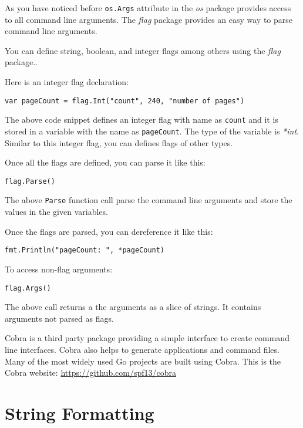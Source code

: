 As you have noticed before \texttt{os.Args} attribute in the \textit{os} package
provides access to all command line arguments.
The \textit{flag} package provides an easy way to parse
command line arguments.

You can define string, boolean, and integer flags among others using
the \textit{flag} package..

Here is an integer flag declaration:

\begin{lstlisting}[numbers=none]
var pageCount = flag.Int("count", 240, "number of pages")
\end{lstlisting}

The above code snippet defines an integer flag with name
as \texttt{count} and it is stored in a variable with the name
as \texttt{pageCount}.  The type of the variable is \textit{*int}.
Similar to this integer flag, you can defines flags of other types.

Once all the flags are defined, you can parse it like this:

\begin{lstlisting}[numbers=none]
flag.Parse()
\end{lstlisting}

The above \texttt{Parse} function call parse the command line
arguments and store the values in the given variables.

Once the flags are parsed, you can dereference it like this:

\begin{lstlisting}[numbers=none]
fmt.Println("pageCount: ", *pageCount)
\end{lstlisting}

To access non-flag arguments:

\begin{lstlisting}[numbers=none]
flag.Args()
\end{lstlisting}

The above call returns a the arguments as a slice of strings.  It
contains arguments not parsed as flags.

Cobra is a third party package providing a simple interface to create
command line interfaces.  Cobra also helps to generate applications
and command files.  Many of the most widely used Go projects are built
using Cobra.  This is the Cobra
website: \url{https://github.com/spf13/cobra}

\section{String Formatting}

